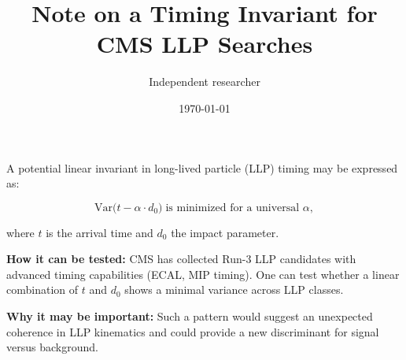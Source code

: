 \documentclass[12pt,a4paper]{article}
\title{Note on a Timing Invariant for CMS LLP Searches}
\author{Independent researcher}
\date{\today}
\begin{document}
\maketitle

\noindent
A potential linear invariant in long-lived particle (LLP) timing may be expressed as:

\[
\mathrm{Var}\big(t - \alpha\cdot d_0\big) \;\text{is minimized for a universal } \alpha,
\]

where $t$ is the arrival time and $d_0$ the impact parameter.

\textbf{How it can be tested:}  
CMS has collected Run-3 LLP candidates with advanced timing capabilities (ECAL, MIP timing). One can test whether a linear combination of $t$ and $d_0$ shows a minimal variance across LLP classes.

\textbf{Why it may be important:}  
Such a pattern would suggest an unexpected coherence in LLP kinematics and could provide a new discriminant for signal versus background.
\end{document}
